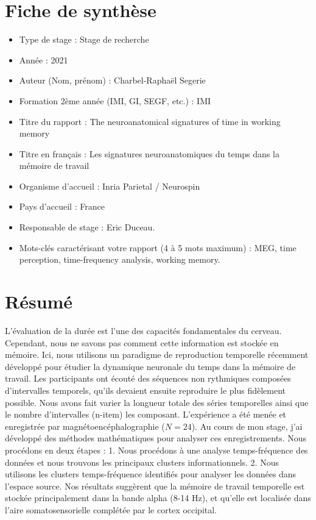 \chapter*{\centering Fiche de synthèse}
\begin{itemize}
    \item Type de stage : Stage de recherche
    \item Année : 2021
    \item Auteur (Nom, prénom) : Charbel-Raphaël Segerie
    \item Formation 2ème année (IMI, GI, SEGF, etc.) : IMI
    \item Titre du rapport : The neuroanatomical signatures of time in working memory
    \item Titre en français : Les signatures neuroanatomiques du temps dans la mémoire de travail
    \item Organisme d’accueil : Inria Parietal / Neurospin
    \item Pays d’accueil : France
    \item Responsable de stage : Eric Duceau.
    \item Mots-clés caractérisant votre rapport (4 à 5 mots maximum) : MEG, time perception, time-frequency analysis, working memory.
\end{itemize}




\chapter*{\centering Résumé}

L'évaluation de la durée est l'une des capacités fondamentales du cerveau. Cependant, nous ne savons pas comment cette information est stockée en mémoire. Ici, nous utilisons un paradigme de reproduction temporelle récemment développé pour étudier la dynamique neuronale du temps dans la mémoire de travail. Les participants ont écouté des séquences non rythmiques composées d'intervalles temporels, qu'ils devaient ensuite reproduire le plus fidèlement possible. Nous avons fait varier la longueur totale des séries temporelles ainsi que le nombre d'intervalles (n-item) les composant. L'expérience a été menée et enregistrée par magnétoencéphalographie ($N=24$). Au cours de mon stage, j'ai développé des méthodes mathématiques pour analyser ces enregistrements. Nous procédons en deux étapes : 1. Nous procédons à une analyse temps-fréquence des données et nous trouvons les principaux clusters informationnels. 2. Nous utilisons les clusters temps-fréquence identifiés pour analyser les données dans l'espace source. Nos résultats suggèrent que la mémoire de travail temporelle est stockée principalement dans la bande alpha (8-14 Hz), et qu'elle est localisée dans l'aire somatosensorielle complétée par le cortex occipital.


